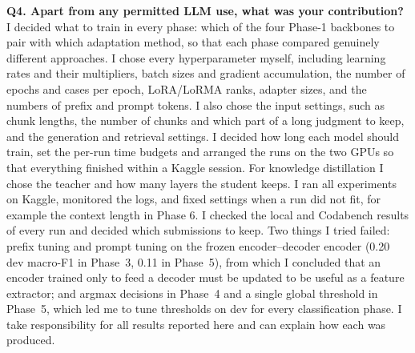 \documentclass[11pt]{article}
\begin{document}
\medskip\noindent\textbf{Q4. Apart from any permitted LLM use, what was your contribution?} I decided what to train in every phase: which of the four Phase-1 backbones to pair with which adaptation method, so that each phase compared genuinely different approaches. I chose every hyperparameter myself, including learning rates and their multipliers, batch sizes and gradient accumulation, the number of epochs and cases per epoch, LoRA/LoRMA ranks, adapter sizes, and the numbers of prefix and prompt tokens. I also chose the input settings, such as chunk lengths, the number of chunks and which part of a long judgment to keep, and the generation and retrieval settings. I decided how long each model should train, set the per-run time budgets and arranged the runs on the two GPUs so that everything finished within a Kaggle session. For knowledge distillation I chose the teacher and how many layers the student keeps. I ran all experiments on Kaggle, monitored the logs, and fixed settings when a run did not fit, for example the context length in Phase 6. I checked the local and Codabench results of every run and decided which submissions to keep. Two things I tried failed: prefix tuning and prompt tuning on the frozen encoder--decoder encoder (0.20 dev macro-F1 in Phase~3, 0.11 in Phase~5), from which I concluded that an encoder trained only to feed a decoder must be updated to be useful as a feature extractor; and argmax decisions in Phase~4 and a single global threshold in Phase~5, which led me to tune thresholds on dev for every classification phase. I take responsibility for all results reported here and can explain how each was produced.
\end{document}
